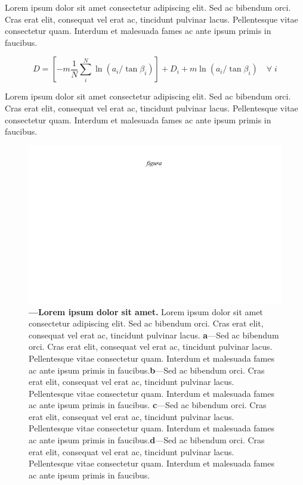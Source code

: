 \documentclass[./main.tex]{subfiles}
\begin{document}
\par Lorem ipsum dolor sit amet consectetur adipiscing elit. Sed ac bibendum orci. Cras erat elit, consequat vel erat ac, tincidunt pulvinar lacus. Pellentesque vitae consectetur quam. Interdum et malesuada fames ac ante ipsum primis in faucibus.
\begin{linenomath*}
\begin{equation}
\label{eq:topmodel:d2}
D = \left[ -m\frac{1}{N} \sum^{N}_{i} \ln{(a_{i}/\tan \beta_{i})}\right] + D_{i} + m \ln{(a_{i}/\tan \beta_{i})} \quad  \forall \; i 
\end{equation}
\end{linenomath*}
Lorem ipsum dolor sit amet consectetur adipiscing elit. Sed ac bibendum orci. Cras erat elit, consequat vel erat ac, tincidunt pulvinar lacus. Pellentesque vitae consectetur quam. Interdum et malesuada fames ac ante ipsum primis in faucibus.

\begin{figure}[t!] 
\centering				
\includegraphics[width=0.98\linewidth]{figs/fig_m.jpg}		
\caption[Lorem ipsum dolor sit amet]
{\textbf{---\;Lorem ipsum dolor sit amet.}
    Lorem ipsum dolor sit amet consectetur adipiscing elit. Sed ac bibendum orci. Cras erat elit, consequat vel erat ac, tincidunt pulvinar lacus. \;\textbf{a}\;---\;Sed ac bibendum orci. Cras erat elit, consequat vel erat ac, tincidunt pulvinar lacus. Pellentesque vitae consectetur quam. Interdum et malesuada fames ac ante ipsum primis in faucibus.\;\textbf{b}\;---\;Sed ac bibendum orci. Cras erat elit, consequat vel erat ac, tincidunt pulvinar lacus. Pellentesque vitae consectetur quam. Interdum et malesuada fames ac ante ipsum primis in faucibus. \;\textbf{c}\;---\;Sed ac bibendum orci. Cras erat elit, consequat vel erat ac, tincidunt pulvinar lacus. Pellentesque vitae consectetur quam. Interdum et malesuada fames ac ante ipsum primis in faucibus.\;\textbf{d}\;---\;Sed ac bibendum orci. Cras erat elit, consequat vel erat ac, tincidunt pulvinar lacus. Pellentesque vitae consectetur quam. Interdum et malesuada fames ac ante ipsum primis in faucibus.
}
\label{fig:hydro:1} 		
\end{figure}
\end{document}
